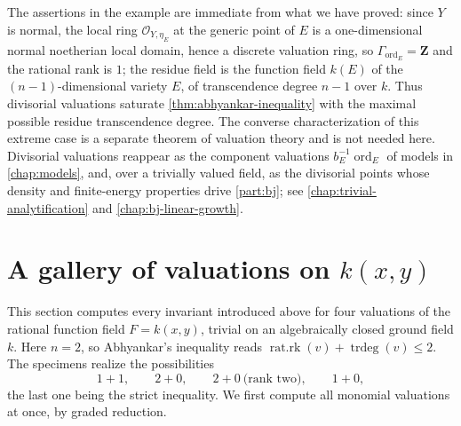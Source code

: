 The assertions in the example are immediate from what we have proved:
since $Y$ is normal, the local ring $\mathcal O_{Y,\eta_E}$ at the generic
point of $E$ is a one-dimensional normal noetherian local domain, hence a
discrete valuation ring, so $\Gamma_{\operatorname{ord}_E}=\mathbf Z$ and
the rational rank is $1$; the residue field is the function field
$k(E)$ of the $(n-1)$-dimensional variety $E$, of transcendence degree
$n-1$ over $k$. Thus divisorial valuations saturate
\cref{thm:abhyankar-inequality} with the maximal possible residue
transcendence degree.  The converse characterization of this extreme case
is a separate theorem of valuation theory and is not needed here.
Divisorial valuations reappear as the
component valuations $b_E^{-1}\operatorname{ord}_E$ of models in
\cref{chap:models}, and, over a trivially valued field, as the divisorial
points whose density and finite-energy properties drive
\cref{part:bj}; see \cref{chap:trivial-analytification} and
\cref{chap:bj-linear-growth}.

\section{A gallery of valuations on
\texorpdfstring{$k(x,y)$}{k(x,y)}}
\label{sec:valuation-gallery}

This section computes every invariant introduced above for four
valuations of the rational function field $F=k(x,y)$, trivial on an
algebraically closed ground field $k$. Here $n=2$, so Abhyankar's
inequality reads
$\operatorname{rat.rk}(v)+\operatorname{trdeg}(v)\leq2$. The specimens
realize the possibilities
\[
 1+1,\qquad 2+0,\qquad 2+0\ \text{(rank two)},\qquad 1+0,
\]
the last one being the strict inequality. We first compute all monomial
valuations at once, by graded reduction.

